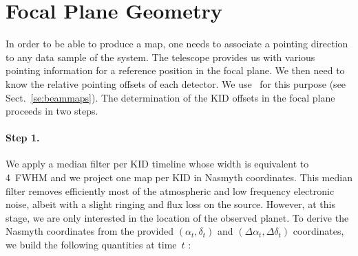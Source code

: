 %
%
%

\section{Focal Plane Geometry}%
\label{se:fov_geometry}



In order to be able to produce a map, one needs to associate a pointing
direction to any data sample of the system. The telescope provides us with
various pointing information for a reference position in the focal plane. We
then need to know the relative pointing offsets of each detector. We use
\bms\ for this purpose (see Sect.~\ref{se:beammaps}). The determination of the
KID offsets in the focal plane proceeds in two steps.

\paragraph{Step 1.} We apply a median filter per
KID timeline whose width is equivalent to 4~FWHM and we project one
map per KID in Nasmyth coordinates. This median filter removes
efficiently most of the atmospheric and low frequency electronic
noise, albeit with a slight ringing and flux loss on the
source. However, at this stage, we are only interested in the location
of the observed planet. To derive the Nasmyth coordinates from the
provided $(\alpha_t,\delta_t)$ and $(\Delta\alpha_t,\Delta\delta_t)$
coordinates, we build the following quantities at time~$t$ :

